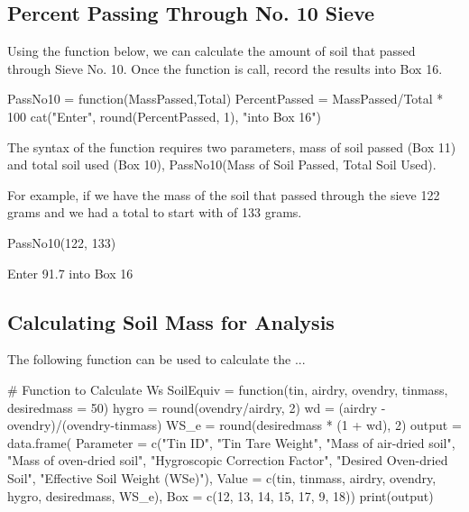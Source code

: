 \documentclass{tufte-handout}
\begin{document}
\subsection{Percent Passing Through No. 10 Sieve}

Using the function below, we can calculate the amount of soil that passed through Sieve No. 10. Once the function is call, record the results into Box 16. 

\begin{Schunk}
\begin{Sinput}
 PassNo10 = function(MassPassed,Total){
   PercentPassed = MassPassed/Total * 100
   cat("Enter", round(PercentPassed, 1), "into Box 16")
 }
\end{Sinput}
\end{Schunk}

The syntax of the function requires two parameters, mass of soil passed (Box 11) and total soil used (Box 10), PassNo10(Mass of Soil Passed, Total Soil Used). 

For example, if we have the mass of the soil that passed through the sieve 122 grams and we had a total to start with of 133 grams.

\begin{Schunk}
\begin{Sinput}
 PassNo10(122, 133)
\end{Sinput}
\begin{Soutput}
Enter 91.7 into Box 16
\end{Soutput}
\end{Schunk}

\subsection{Calculating Soil Mass for Analysis}

The following function can be used to calculate the ...

\begin{Schunk}
\begin{Sinput}
 # Function to Calculate Ws 
 SoilEquiv = function(tin, airdry, ovendry, tinmass, desiredmass = 50){
 hygro = round(ovendry/airdry, 2)
 wd = (airdry - ovendry)/(ovendry-tinmass)
 WS_e = round(desiredmass * (1 + wd), 2)
 output = data.frame(
   Parameter = c("Tin ID", "Tin Tare Weight", "Mass of air-dried soil", 
       "Mass of oven-dried soil", "Hygroscopic Correction Factor", 
       "Desired Oven-dried Soil", "Effective Soil Weight (WSe)"),
   Value = c(tin, tinmass, airdry, ovendry, hygro, desiredmass, WS_e),
   Box = c(12, 13, 14, 15, 17, 9, 18))
 print(output)
 }
\end{Sinput}
\end{Schunk}
\end{document}
